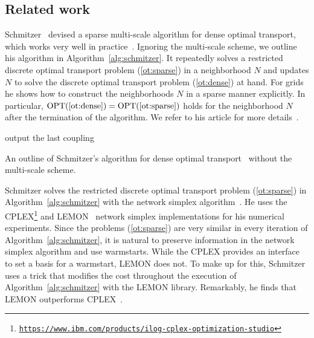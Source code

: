 \documentclass[a4paper,UKenglish,cleveref, autoref, thm-restate]{lipics-v2021}
\DeclareMathOperator{\OPT}{OPT}
\begin{document}
\subsection{Related work}
Schmitzer~\cite{schmitzer2016sparse} devised a sparse multi-scale algorithm for dense optimal transport, which works very well in practice~\cite{schrieber2017dotmark}.
Ignoring the multi-scale scheme, we outline his algorithm in Algorithm~\ref{alg:schmitzer}.
It repeatedly solves a restricted discrete optimal transport problem (\ref{ot:sparse}) in a neighborhood $N$ and updates $N$ to solve the discrete optimal transport problem (\ref{ot:dense}) at hand.
For grids he shows how to construct the neighborhoods $N$ in a sparse manner explicitly.
In particular, $\OPT(\text{\ref{ot:dense}}) = \OPT(\text{\ref{ot:sparse}})$ holds for the neighborhood $N$ after the termination of the algorithm.
We refer to his article for more details~\cite{schmitzer2016sparse}.
\begin{algorithm}[h]
\DontPrintSemicolon
{}
output the last coupling\;
\caption{An outline of Schmitzer's algorithm for dense optimal transport~\cite{schmitzer2016sparse} without the multi-scale scheme.}\label{alg:schmitzer}
\end{algorithm}

Schmitzer solves the restricted discrete optimal transport problem (\ref{ot:sparse}) in Algorithm~\ref{alg:schmitzer} with the network simplex algorithm~\cite{ahuja1993networkflows}.
He uses the CPLEX\footnote{\href{https://www.ibm.com/products/ilog-cplex-optimization-studio}{\tt https://www.ibm.com/products/ilog-cplex-optimization-studio}} and LEMON~\cite{dezso2010lemon} network simplex implementations for his numerical experiments.
Since the problems (\ref{ot:sparse}) are very similar in every iteration of Algorithm~\ref{alg:schmitzer}, it is natural to preserve information in the network simplex algorithm and use warmstarts.
While the CPLEX provides an interface to set a basis for a warmstart, LEMON does not.
To make up for this, Schmitzer uses a trick that modifies the cost throughout the execution of Algorithm~\ref{alg:schmitzer} with the LEMON library.
Remarkably, he finds that LEMON outperforms CPLEX~\cite{schmitzer2016sparse}.
\end{document}
